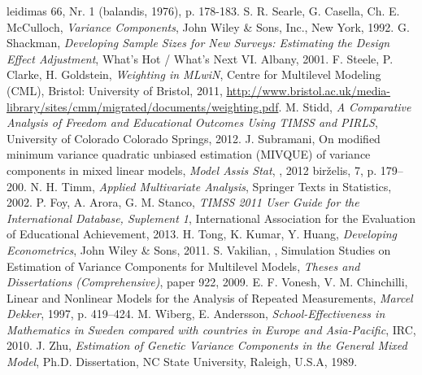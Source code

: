 \documentclass[11pt,a4paper]{article}
\begin{document}
\begin{thebibliography}{1}
leidimas 66, Nr. 1 (balandis, 1976), p. 178-183.
 S. R. Searle, G. Casella, Ch. E. McCulloch, \textit{Variance Components}, John Wiley \& Sons, Inc., New York, 1992.
 G. Shackman, \textit{Developing Sample Sizes for New Surveys: Estimating the Design Effect Adjustment}, What’s Hot / What’s Next VI. Albany, 2001.
 F. Steele, P. Clarke, H. Goldstein, \textit{Weighting in MLwiN}, Centre for Multilevel Modeling (CML), Bristol: University of Bristol, 2011, \href{http://www.bristol.ac.uk/media-library/sites/cmm/migrated/documents/weighting.pdf}{http://www.bristol.ac.uk/media-library/sites/cmm/migrated/documents/weighting.pdf}.
 M. Stidd, \textit{A Comparative Analysis of Freedom and Educational Outcomes Using TIMSS and PIRLS}, University of Colorado Colorado Springs, 2012.
J. Subramani, On modified minimum variance quadratic unbiased estimation (MIVQUE) of variance components in mixed linear models, \textit{Model Assis Stat}, , 2012 birželis, 7, p. 179–200.
N. H. Timm, \textit{Applied Multivariate Analysis}, Springer Texts in Statistics, 2002.
 P. Foy, A. Arora, G. M. Stanco, \textit{TIMSS 2011 User Guide for the International Database, Suplement 1}, International Association for the Evaluation of Educational Achievement, 2013.
H. Tong, K. Kumar, Y. Huang, \textit{Developing Econometrics}, John Wiley \& Sons, 2011.
 S. Vakilian, , Simulation Studies on Estimation of Variance Components for Multilevel Models, \textit{Theses and Dissertations (Comprehensive)}, paper 922, 2009.
  E. F. Vonesh, V. M. Chinchilli, Linear and Nonlinear Models for the Analysis of Repeated Measurements, \textit{ Marcel Dekker}, 1997, p. 419–424.
 M. Wiberg, E. Andersson, \textit{School-Effectiveness in Mathematics in Sweden compared with countries in Europe and Asia-Pacific}, IRC, 2010.
 J. Zhu, \textit{Estimation of Genetic Variance Components in the General Mixed Model},  Ph.D.
Dissertation, NC State University, Raleigh, U.S.A, 1989.
\end{thebibliography}
\end{document}
